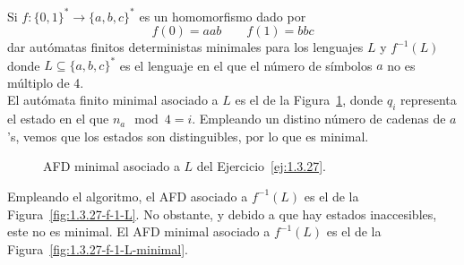 \begin{ejercicio}\label{ej:1.3.27}
    Si $f:{\{0,1\}}^{\ast}\rightarrow{\{a,b,c\}}^{\ast}$ es un homomorfismo dado por
    \begin{equation*}
        f(0) = aab \qquad f(1) = bbc
    \end{equation*}
    dar autómatas finitos deterministas minimales para los lenguajes $L$ y $f^{-1}(L)$ donde $L\subseteq {\{a,b,c\}}^{\ast}$ es el lenguaje en el que el número de símbolos $a$ no es múltiplo de 4.\\

    El autómata finito minimal asociado a $L$ es el de la Figura~\ref{fig:1.3.27-L}, donde $q_i$ representa el estado en el que $n_a \mod 4 = i$.
    Empleando un distino número de cadenas de $a$'s, vemos que los estados son distinguibles, por lo que es minimal.
    \begin{figure}[H]
        \centering
        \caption{AFD minimal asociado a $L$ del Ejercicio~\ref{ej:1.3.27}.}
        \label{fig:1.3.27-L}
    \end{figure}

    Empleando el algoritmo, el AFD asociado a $f^{-1}(L)$ es el de la Figura~\ref{fig:1.3.27-f-1-L}.
    No obstante, y debido a que hay estados inaccesibles, este no es minimal. El AFD minimal asociado a $f^{-1}(L)$ es el de la Figura~\ref{fig:1.3.27-f-1-L-minimal}.
    \begin{figure}[H]
        \centering
\end{figure}
\end{ejercicio}

